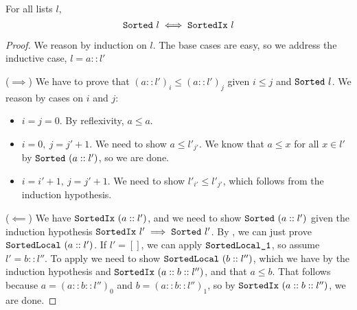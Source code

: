 \documentclass[sigplan,10pt,anonymous,review]{thesis}
\begin{document}
\begin{theorem}
  For all lists $l$,
  \begin{equation*}
    \texttt{\textup{Sorted}}~l \iff \texttt{\textup{SortedIx}}~l
  \end{equation*}
\end{theorem}
\begin{proof}
  We reason by induction on $l$. The base cases are easy, so we
  address the inductive case, $l = a :: l'$

  ($\implies$) We have to prove that $(a :: l')_i \le (a :: l')_j$ given
  $i \le j$ and $\texttt{\textup{Sorted}}~l$. We reason by cases on $i$ and $j$:
  \begin{itemize}
  \item $i = j = 0$. By reflexivity, $a \le a$.
  \item $i = 0,~j=j' + 1$. We need to show $a \le l'_{j'}$. We know that
    $a \le x$ for all $x \in l'$ by $\texttt{\textup{Sorted}}~(a::l')$, so we are
    done.
  \item $i = i' +1,~j = j' + 1$. We need to show $l'_{i'} \le l'_{j'}$,
    which follows from the induction hypothesis.
  \end{itemize}

  ($\impliedby$) We have $\texttt{\textup{SortedIx}}\ \allowbreak(a :: l')$, and
  we need to show $\texttt{\textup{Sorted}}\ \allowbreak(a :: l')$ given the
  induction hypothesis $\texttt{\textup{SortedIx}}~l' \implies \texttt{\textup{Sorted}}~l'$.
  By , we can just prove
  $\texttt{\textup{SortedLocal}}\ \allowbreak(a :: l')$. If $l' = []$, we can
  apply $\texttt{\textup{SortedLocal\_1}}$, so assume $l' = b :: l''$. To apply
   we need to show
  $\var{SortedLocal}\ \allowbreak(b :: l'')$, which we have by the
  induction hypothesis and $\texttt{\textup{SortedIx}}\ \allowbreak(a :: b ::
  l'')$, and that $a \le b$. That follows because $a = (a :: b ::
  l'')_0$ and $b = (a :: b :: l'')_1$, so by
  $\texttt{\textup{SortedIx}}\ \allowbreak(a :: b :: l'')$, we are done.
\end{proof}

\subsection{}
\label{subsec:perm}
\end{document}
